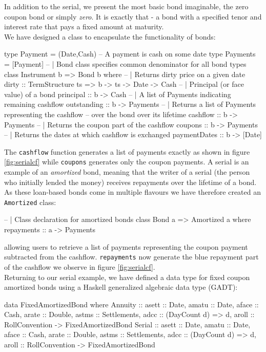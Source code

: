 In addition to the serial, we present the most basic bond imaginable, the zero 
coupon bond or simply \emph{zero}. It is exactly that - a bond with a specified 
tenor and interest rate that pays a fixed amount at maturity.\\

We have designed a class to encapsulate the functionality of bonds:

\begin{hscode}
type Payment = (Date,Cash) -- A payment is cash on some date
type Payments = [Payment]
-- | Bond class specifies common denominator for all bond types 
class Instrument b => Bond b where
  -- | Returns dirty price on a given date
  dirty :: TermStructure ts => b -> ts -> Date -> Cash
  -- | Principal (or face value) of a bond
  principal    :: b -> Cash
  -- | A list of Payments indicating remaining cashflow
  outstanding  :: b -> Payments
  -- | Returns a list of Payments representing the cashflow
  -- over the bond over its lifetime
  cashflow     :: b -> Payments
  -- | Returns the coupon part of the cashflow
  coupons      :: b -> Payments
  -- | Returns the dates at which cashflow is exchanged
  paymentDates :: b -> [Date]
\end{hscode}

The \texttt{cashflow} function generates a list of payments exactly as shown
in figure \ref{fig:serialcf} while \texttt{coupons} generates only the coupon
payments.
A serial is an example of an \emph{amortized} bond, meaning that the writer
of a serial (the person who initially lended the money) receives repayments over
the lifetime of a bond. As these loan-based bonds come in multiple flavours
we have therefore created an \texttt{Amortized} class:

\begin{hscode}
-- | Class declaration for amortized bonds
class Bond a => Amortized a where
  repayments :: a -> Payments
\end{hscode}

allowing users to retrieve a list of payments representing the coupon payment
subtracted from the cashflow. \texttt{repayments} now generate the blue repayment part of the cashflow
we observe in figure \ref{fig:serialcf}.\\

Returning to our serial example, we have defined a data type for fixed coupon
amortized bonds using a Haskell generalized algebraic data type (GADT):

\begin{hscode}
data FixedAmortizedBond where 
  Annuity :: { asett :: Date,
               amatu :: Date,
               aface :: Cash,
               arate :: Double,
               astms :: Settlements,
               adcc  :: (DayCount d) => d,
               aroll :: RollConvention } -> FixedAmortizedBond
  Serial :: {  asett :: Date,
               amatu :: Date,
               aface :: Cash,
               arate :: Double,
               astms :: Settlements,
               adcc  :: (DayCount d) => d,
               aroll :: RollConvention } -> FixedAmortizedBond
\end{hscode}

